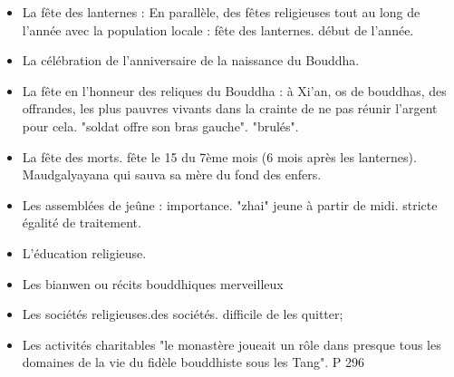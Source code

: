 \begin{itemize}
        \item La fête des lanternes : En parallèle, des fêtes religieuses tout au long de l'année avec la population locale : fête des lanternes.  début de l'année.
        \item La célébration de l'anniversaire de la naissance du Bouddha.
        \item La fête en l'honneur des reliques du Bouddha : à Xi'an, os de bouddhas, des offrandes, les plus pauvres vivants dans la crainte de ne pas réunir l'argent pour cela. "soldat offre son bras gauche". "brulés".  
        \item La fête des morts. fête le 15 du 7ème mois (6 mois après les lanternes). Maudgalyayana qui sauva sa mère du fond des enfers.
        \item Les assemblées de jeûne : importance. "zhai" jeune à partir de midi. stricte égalité de traitement.
        \item L'éducation religieuse. 
        \item Les bianwen ou récits bouddhiques merveilleux
        \item Les sociétés religieuses.des sociétés. difficile de les quitter; 
        \item Les activités charitables "le monastère joueait un rôle dans presque tous les domaines de la vie du fidèle bouddhiste sous les Tang". P 296
    \end{itemize}

